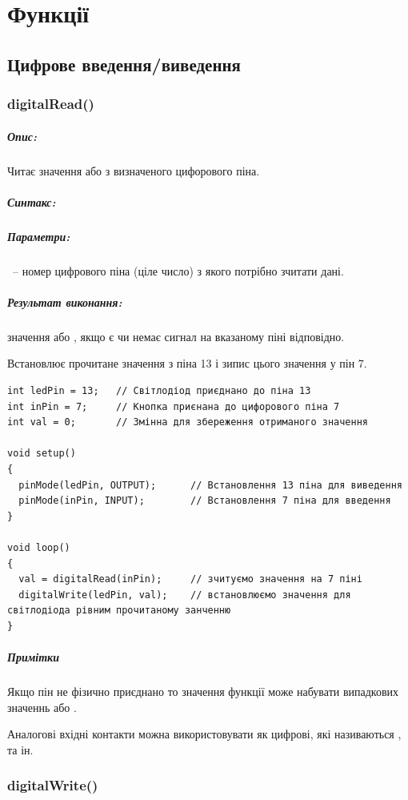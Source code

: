 \documentclass[12pt,a4paper]{report}  %
\begin{document}

\section{Функції}

\subsection{Цифрове введення/виведення}

\subsubsection{digitalRead()}

\subparagraph{Опис:}

Читає значення  або  з визначеного цифорового піна.
\subparagraph{Синтакс:}
\subparagraph{Параметри:}
~-- номер цифрового піна (ціле число) з якого потрібно зчитати дані.
\subparagraph{Результат виконання:}
значення  або , якщо є чи немає сигнал на вказаному піні відповідно.

Встановлює прочитане значення з піна 13 і зипис цього значення у пін 7.
\begin{lstlisting}[label=digitalreadwrite,caption=Використання функції digitalRead()]
int ledPin = 13;   // Світлодіод приєднано до піна 13
int inPin = 7;     // Кнопка приєнана до цифорового піна 7
int val = 0;       // Змінна для збереження отриманого значення

void setup()
{
  pinMode(ledPin, OUTPUT);      // Встановлення 13 піна для виведення
  pinMode(inPin, INPUT);        // Встановлення 7 піна для введення
}

void loop()
{
  val = digitalRead(inPin);     // зчитуємо значення на 7 піні
  digitalWrite(ledPin, val);    // встановлюємо значення для світлодіода рівним прочитаному занченню
}
\end{lstlisting}

\subparagraph{Примітки}

Якщо пін не фізично приєднано то значення функції  може набувати випадкових значеннь  або .

Аналогові вхідні контакти можна використовувати як цифрові, які називаються ,  та ін.

\subsubsection{digitalWrite()}
\end{document}
